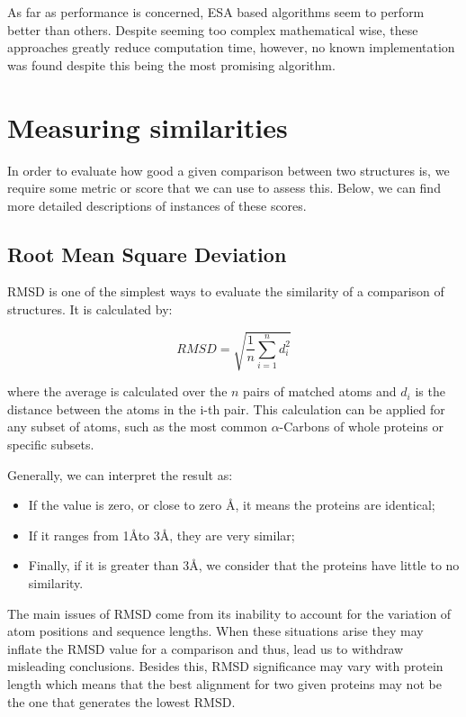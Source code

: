 As far as performance is concerned, ESA based algorithms seem to perform better than others. Despite seeming too complex mathematical wise, these approaches greatly reduce computation time, however, no known implementation was found despite this being the most promising algorithm.

\section{Measuring similarities}

In order to evaluate how good a given comparison between two structures is, we require some metric or score that we can use to assess this. Below, we can find more detailed descriptions of instances of these scores.

\subsection{Root Mean Square Deviation}

RMSD is one of the simplest ways to evaluate the similarity of a comparison of structures. It is calculated by:

$$RMSD = \sqrt{\frac{1}{n} \sum_{i=1}^{n} d_i^2}$$

where the average is calculated over the $n$ pairs of matched atoms and $d_i$ is the distance between the atoms in the i-th pair. This calculation can be applied for any subset of atoms, such as the most common $\alpha$-Carbons of whole proteins or specific subsets. 

Generally, we can interpret the result as:
\begin{itemize}
	\item If the value is zero, or close to zero \AA, it means the proteins are identical;
	\item If it ranges from 1\AA\quad to 3\AA , they are very similar;
	\item Finally, if it is greater than 3\AA, we consider that the proteins have little to no similarity.
\end{itemize}

The main issues of RMSD come from its inability to account for the variation of atom positions and sequence lengths. When these situations arise they may inflate the RMSD value for a comparison and thus, lead us to withdraw misleading conclusions. Besides this, RMSD significance may vary with protein length which means that the best alignment for two given proteins may not be the one that generates the lowest RMSD. 

